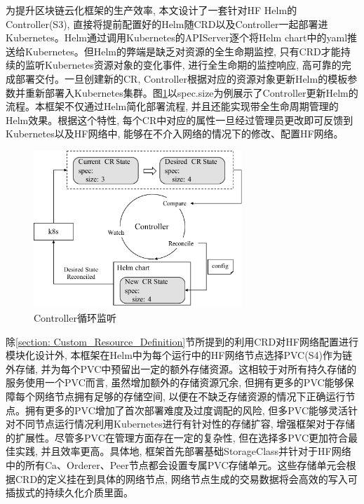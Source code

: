 为提升区块链云化框架的生产效率, 本文设计了一套针对HF Helm的Controller(S3), 直接将提前配置好的Helm随CRD以及Controller一起部署进Kubernetes。Helm通过调用Kubernetes的APIServer逐个将Helm chart中的yaml推送给Kubernetes。但Helm的弊端是缺乏对资源的全生命期监控, 只有CRD才能持续的监听Kubernetes资源对象的变化事件, 进行全生命期的监控响应, 高可靠的完成部署交付。一旦创建新的CR, Controller根据对应的资源对象更新Helm的模板参数并重新部署入Kubernetes集群。图\ref{controller}以spec.size为例展示了Controller更新Helm的流程。本框架不仅通过Helm简化部署流程, 并且还能实现带全生命周期管理的Helm效果。根据这个特性, 每个CR中对应的属性一旦经过管理员更改即可反馈到Kubernetes以及HF网络中, 能够在不介入网络的情况下的修改、配置HF网络。

\begin{figure}[h] %
    \centering %
    \includegraphics[width=0.7\textwidth]{FIGs/chapter4/controller.pdf} %
    \caption{Controller循环监听} %
    \label{controller} %
\end{figure}%


除\ref{section: Custom_Resource_Definition}节所提到的利用CRD对HF网络配置进行模块化设计外, 本框架在Helm中为每个运行中的HF网络节点选择PVC(S4)作为链外存储, 并为每个PVC中预留出一定的额外存储资源。这相较于对所有持久存储的服务使用一个PVC而言, 虽然增加额外的存储资源冗余, 但拥有更多的PVC能够保障每个网络节点拥有足够的存储空间, 以便在不缺乏存储资源的情况下正确运行节点。拥有更多的PVC增加了首次部署难度及过度调配的风险, 但多PVC能够灵活针对不同节点运行情况利用Kubernetes进行有针对性的存储扩容, 增强框架对于存储的扩展性。尽管多PVC在管理方面存在一定的复杂性, 但在选择多PVC更加符合最佳实践, 并且效率更高\cite{d2020design}。具体地, 框架首先部署基础StorageClass并针对于HF网络中的所有Ca、Orderer、Peer节点都会设置专属PVC存储单元。这些存储单元会根据CRD的定义挂在到具体的网络节点, 网络节点生成的交易数据将会高效的写入可插拔式的持续久化介质里面。


